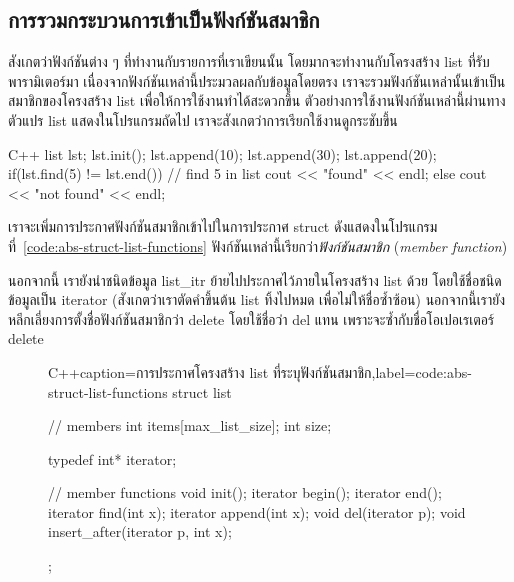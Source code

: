 \subsection{การ{\wbr}รวม{\wbr}กระบวนการ{\wbr}เข้า{\wbr}เป็น{\wbr}ฟังก์ชัน{\wbr}สมาชิก} 

สังเกต{\wbr}ว่า{\wbr}ฟังก์ชัน{\wbr}ต่าง ๆ ที่ทำงาน{\wbr}กับ{\wbr}รายการ{\wbr}ที่{\wbr}เรา{\wbr}เขียน{\wbr}นั้น โดยมาก{\wbr}จะ{\wbr}ทำงาน{\wbr}กับ{\wbr}โครงสร้าง{\wbr}
{\ct list} ที่{\wbr}รับ{\wbr}พารามิเตอร์{\wbr}มา เนื่องจาก{\wbr}ฟังก์ชัน{\wbr}เหล่านี้{\wbr}ประมวลผล{\wbr}กับ{\wbr}ข้อมูล{\wbr}โดย{\wbr}ตรง{\wbr}
เรา{\wbr}จะ{\wbr}รวม{\wbr}ฟังก์ชัน{\wbr}เหล่านั้น{\wbr}เข้า{\wbr}เป็น{\wbr}สมาชิก{\wbr}ของ{\wbr}โครงสร้าง {\ct list}
เพื่อให้{\wbr}การ{\wbr}ใช้{\wbr}งาน{\wbr}ทำ{\wbr}ได้{\wbr}สะดวก{\wbr}ขึ้น ตัวอย่าง{\wbr}การ{\wbr}ใช้{\wbr}งาน{\wbr}ฟังก์ชัน{\wbr}เหล่านี้{\wbr}ผ่าน{\wbr}ทาง{\wbr}ตัวแปร {\ct
  list} แสดง{\wbr}ใน{\wbr}โปรแกรม{\wbr}ถัด{\wbr}ไป เรา{\wbr}จะ{\wbr}สังเกต{\wbr}ว่า{\wbr}การ{\wbr}เรียก{\wbr}ใช้{\wbr}งาน{\wbr}ดู{\wbr}กระชับ{\wbr}ขึ้น{\wbr}

\latintext
\begin{codelist}{C++}{}
  list lst;
  lst.init();
  lst.append(10);  lst.append(30);  lst.append(20);
  if(lst.find(5) != lst.end())  // find 5 in list
    cout << "found" << endl;
  else
    cout << "not found" << endl;
\end{codelist}
\thaitext

เรา{\wbr}จะ{\wbr}เพิ่ม{\wbr}การ{\wbr}ประกาศ{\wbr}ฟังก์ชัน{\wbr}สมาชิก{\wbr}เข้า{\wbr}ไป{\wbr}ใน{\wbr}การ{\wbr}ประกาศ {\ct struct}
ดัง{\wbr}แสดง{\wbr}ใน{\wbr}โปรแกรม{\wbr}ที่~\ref{code:abs-struct-list-functions}
ฟังก์ชัน{\wbr}เหล่านี้{\wbr}เรียก{\wbr}ว่า{\em ฟังก์ชัน{\wbr}สมาชิก} ({\em member function})

นอกจากนี้ เรา{\wbr}ยัง{\wbr}นำ{\wbr}ชนิด{\wbr}ข้อมูล {\ct list\_itr} ย้าย{\wbr}ไป{\wbr}ประกาศ{\wbr}ไว้{\wbr}ภายใน{\wbr}โครงสร้าง {\ct
  list} ด้วย โดย{\wbr}ใช้{\wbr}ชื่อ{\wbr}ชนิด{\wbr}ข้อมูล{\wbr}เป็น {\ct iterator} (สังเกต{\wbr}ว่า{\wbr}เรา{\wbr}ตัด{\wbr}คำขึ้นต้น {\ct
  list} ทิ้ง{\wbr}ไป{\wbr}หมด เพื่อ{\wbr}ไม่{\wbr}ให้{\wbr}ชื่อ{\wbr}ซ้ำซ้อน) นอกจากนี้{\wbr}เรา{\wbr}ยัง{\wbr}หลีกเลี่ยง{\wbr}การ{\wbr}ตั้ง{\wbr}ชื่อ{\wbr}ฟังก์ชัน{\wbr}สมาชิก{\wbr}ว่า{\wbr}
{\ct delete} โดย{\wbr}ใช้{\wbr}ชื่อ{\wbr}ว่า {\ct del} แทน เพราะ{\wbr}จะ{\wbr}ซ้ำ{\wbr}กับ{\wbr}ชื่อ{\wbr}โอ{\wbr}เปอเรเตอร์ {\ct
  delete}

\begin{figure}
\latintext
\begin{codelist}{C++}{caption={\thaitext การ{\wbr}ประกาศ{\wbr}โครงสร้าง {\ct list} ที่{\wbr}ระบุ{\wbr}ฟังก์ชัน{\wbr}สมาชิก\latintext},label=code:abs-struct-list-functions}
struct list {
  // members
  int items[max_list_size];
  int size;

  typedef int* iterator;

  // member functions
  void init();
  iterator begin();
  iterator end();
  iterator find(int x);
  iterator append(int x);
  void del(iterator p);
  void insert_after(iterator p, int x);
};
\end{codelist}
\thaitext
\end{figure}

